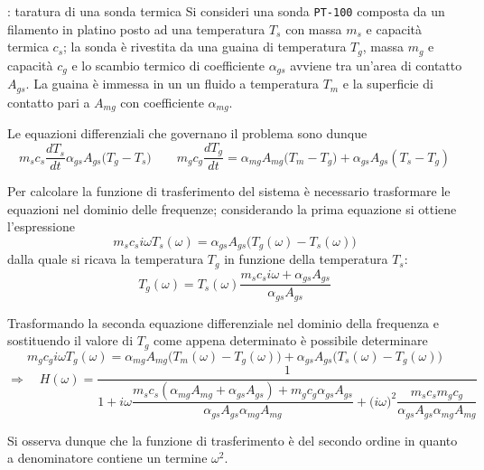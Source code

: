 	
	
	
	
	\begin{esempio}{: taratura di una sonda termica}
		Si consideri una sonda \texttt{PT-100} composta da un filamento in platino posto ad una temperatura $T_s$ con massa $m_s$ e capacità termica $c_s$; la sonda è rivestita da una guaina di temperatura $T_g$, massa $m_g$ e capacità $c_g$ e lo scambio termico di coefficiente $\alpha_{gs}$ avviene tra un'area di contatto $A_{gs}$. La guaina è immessa in un un fluido a temperatura $T_m$ e la superficie di contatto pari a $A_{mg}$ con coefficiente $\alpha_{mg}$.
		
		Le equazioni differenziali che governano il problema sono dunque
		\[ m_s c_s \frac{dT_s}{dt} \alpha_{gs} A_{gs} \big(T_g -T_s\big) \qquad m_g c_g \frac{dT_g}{dt} = \alpha_{mg} A_{mg} \big(T_m-T_g\big) + \alpha_{gs}A_{gs}(T_s- T_g)\]
		
		Per calcolare la funzione di trasferimento del sistema è necessario trasformare le equazioni nel dominio delle frequenze; considerando la prima equazione si ottiene l'espressione
		\[m_s c_s i\omega T_s(\omega) = \alpha_{gs} A_{gs}\Big( T_{g}(\omega) - T_{s}(\omega)\Big) \]
		dalla quale si ricava la temperatura $T_g$ in funzione della temperatura $T_s$:
		\[ T_g(\omega) = T_s(\omega) \frac{m_s c_s i\omega + \alpha_{gs} A_{gs}}{\alpha_{gs}A_{gs}} \]
		
		Trasformando la seconda equazione differenziale nel dominio della frequenza e sostituendo il valore di $T_g$ come appena determinato è possibile determinare
		\[ m_g c_g i\omega T_g(\omega) = \alpha_{mg} A_{mg} \Big(T_m(\omega) - T_g(\omega)\Big) + \alpha_{gs} A_{gs} \Big(T_s(\omega) - T_g(\omega)\Big) \]
		\[ \Rightarrow \quad H(\omega) = \frac 1 {1 + i\omega \dfrac{m_s c_s (\alpha_{mg} A_{mg} + \alpha_{gs} A_{gs} ) + m_g c_g \alpha_{gs} A_{gs} }{\alpha_{gs} A_{gs}\alpha_{mg} A_{mg} }  + \big(i\omega\big)^2 \dfrac{m_s c_s m_g c_g}{\alpha_{gs} A_{gs} \alpha_{mg} A_{mg} } } \]
		
		Si osserva dunque che la funzione di trasferimento è del secondo ordine in quanto a denominatore contiene un termine $\omega^2$.
		
	\end{esempio}
	
	
	
	
	
	
	
	
	
	
	
	
	
	
	
	
	
	
	
